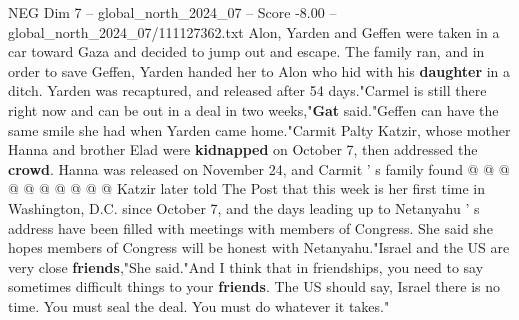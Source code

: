 \begin{textsample}{NEG Dim 7 – global\_north\_2024\_07 – Score -8.00 – global\_north\_2024\_07/111127362.txt}
Alon, Yarden and Geffen were taken in a car toward Gaza and decided to jump out and escape.
The family ran, and in order to save Geffen, Yarden handed her to Alon who hid with his \textbf{daughter} in a ditch.
Yarden was recaptured, and released after 54 days."Carmel is still there right now and can be out in a deal in two weeks,"\textbf{Gat} said."Geffen can have the same smile she had when Yarden came home."Carmit Palty Katzir, whose mother Hanna and brother Elad were \textbf{kidnapped} on October 7, then addressed the \textbf{crowd}.
Hanna was released on November 24, and Carmit ' s family found @ @ @ @ @ @ @ @ @ @ Katzir later told The Post that this week is her first time in Washington, D.C. since October 7, and the days leading up to Netanyahu ' s address have been filled with meetings with members of Congress.
She said she hopes members of Congress will be honest with Netanyahu."Israel and the US are very close \textbf{friends},"She said."And I think that in friendships, you need to say sometimes difficult things to your \textbf{friends}.
The US should say, Israel there is no time.
You must seal the deal.
You must do whatever it takes."

\end{textsample}
